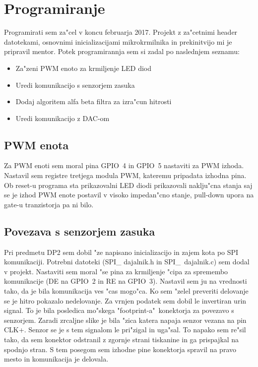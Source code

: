 \documentclass[a4paper]{article}
\begin{document}
\section{Programiranje}
Programirati sem za"cel v koncu februarja 2017.
Projekt z za"cetnimi header datotekami, osnovnimi inicializacijami mikrokrmilnika in prekinitvijo mi je pripravil mentor. Potek programirannja sem si zadal po naslednjem seznamu:
\begin{itemize}
\item Za"zeni PWM enoto za krmiljenje LED diod
\item Uredi komunikacijo s senzorjem zasuka
\item Dodaj algoritem alfa beta filtra za izra"cun hitrosti
\item Uredi komunikacijo z DAC-om
\end{itemize}

\subsection{PWM enota}

Za PWM enoti sem moral pina GPIO~4 in GPIO~5 nastaviti za PWM izhoda. Nastavil sem registre tretjega modula PWM, kateremu pripadata izhodna pina. Ob \mbox{reset-u} programa sta prikazovalni LED diodi prikazovali naklju"cna stanja saj se je izhod PWM enote postavil v visoko impedan"cno stanje, pull-down upora na gate-u tranzistorja pa ni bilo.

\subsection{Povezava s senzorjem zasuka}

Pri predmetu DP2 sem dobil "ze napisano inicializacijo in zajem kota po SPI komunikaciji. Potrebni datoteki (SPI\_ dajalnik.h in \mbox{SPI\_ dajalnik.c}) sem dodal v projekt. Nastaviti sem moral "se pina za krmiljenje "cipa za spremembo komunikacije (DE na GPIO~2 in RE na GPIO~3). Nastavil sem ju na vrednosti tako, da je bila komunikacija ves "cas mogo"ca. Ko sem "zelel preveriti delovanje se je hitro pokazalo nedelovanje. Za vrnjen podatek sem dobil le invertiran urin signal. To je bila posledica mo"skega "\mbox{footprint-a}"~konektorja za povezavo s senzorjem. Zaradi zrcaljne slike je bila "zica katera napaja senzor vezana na pin CLK+. Senzor se je s tem signalom le pri"zigal in uga"sal. To napako sem re"sil tako, da sem konektor odstranil z zgornje strani tiskanine in ga prispajkal na spodnjo stran. S tem posegom sem izhodne pine konektorja spravil na pravo mesto in komunikacija je delovala.
\end{document}
